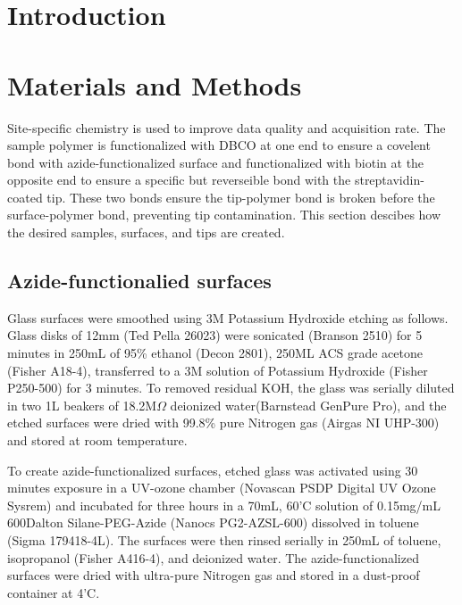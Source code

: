 \documentclass[%
  aip,12pt,tightenlines,
  amsthm,
 amsmath,amssymb,
 reprint,%
]{revtex4-1}
\newcommand{\sLabel}[1]{\label{section:#1}}
\newcommand{\firstp}[0]{\noindent}
\newcommand{\pl}[0]{\vspace{6pt}}
\newcommand{\supply}[2]{(#1 #2)}
\begin{document}
\section{\sLabel{Intro}Introduction}

\section{\sLabel{Materials}Materials and Methods}

Site-specific chemistry is used to improve data quality and acquisition rate. The sample polymer is functionalized with DBCO at one end to ensure a covelent bond with azide-functionalized surface and functionalized with biotin at the opposite end to ensure a specific but reverseible bond with the streptavidin-coated tip. These two bonds ensure the tip-polymer bond is broken before the surface-polymer bond, preventing tip contamination. This section descibes how the desired samples, surfaces, and tips are created.

\subsection{\sLabel{Surface}Azide-functionalied surfaces}

\firstp Glass surfaces were smoothed using 3M Potassium Hydroxide etching as follows. Glass disks of 12mm \supply{Ted Pella}{26023} were sonicated \supply{Branson}{2510} for 5 minutes in 250mL of 95\% ethanol \supply{Decon}{2801}, 250ML ACS grade acetone \supply{Fisher}{A18-4}, transferred to a 3M solution of Potassium Hydroxide \supply{Fisher}{P250-500} for 3 minutes. To removed residual KOH, the glass was serially diluted in two 1L beakers of 18.2M$\Omega$ deionized water\supply{Barnstead}{GenPure Pro}, and the etched surfaces were dried with 99.8\% pure Nitrogen gas \supply{Airgas}{NI UHP-300} and stored at room temperature. \pl

To create azide-functionalized surfaces, etched glass was activated using 30 minutes exposure in a UV-ozone chamber \supply{Novascan}{PSDP Digital UV Ozone Sysrem} and incubated for three hours in a 70mL, 60'C solution of 0.15mg/mL 600Dalton Silane-PEG-Azide \supply{Nanocs}{PG2-AZSL-600} dissolved in toluene \supply{Sigma}{179418-4L}. The surfaces were then rinsed serially in 250mL of toluene, isopropanol \supply{Fisher}{A416-4}, and deionized water. The azide-functionalized surfaces were dried with ultra-pure Nitrogen gas and stored in a dust-proof container at 4'C. \pl 
\end{document}
